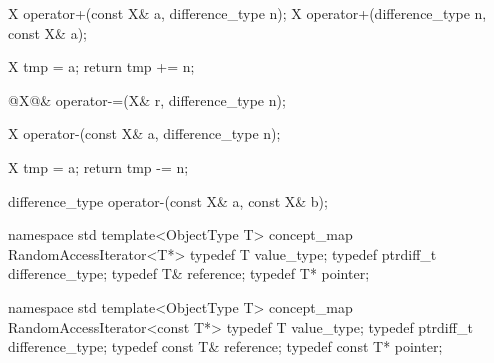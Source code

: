 \documentclass[american,twoside]{book}
\begin{document}
\begin{itemdecl}
X operator+(const X& a, difference_type n);
X operator+(difference_type n, const X& a);
\end{itemdecl}

\pnum
{}
\begin{codeblock}
{ X tmp = a;
return tmp += n; }
\end{codeblock}

\pnum
{}

\begin{itemdecl}
@\textcolor{addclr}{X}@& operator-=(X& r, difference_type n);
\end{itemdecl}

\pnum
{}

\begin{itemdecl}
X operator-(const X& a, difference_type n);
\end{itemdecl}

\pnum
{}
\begin{codeblock}
{ X tmp = a;
  return tmp -= n; }
\end{codeblock}

\begin{itemdecl}
difference_type operator-(const X& a, const X& b);
\end{itemdecl}

\pnum
{}

\pnum
{}

\pnum
{}

\pnum
{}

\begin{codeblock}
namespace std {
  template<ObjectType T> concept_map RandomAccessIterator<T*> {
    typedef T value_type;
    typedef ptrdiff_t difference_type;
    typedef T& reference;
    typedef T* pointer;
  }
}
\end{codeblock}


\begin{codeblock}
namespace std {
  template<ObjectType T> concept_map RandomAccessIterator<const T*> {
    typedef T value_type;
    typedef ptrdiff_t difference_type;
    typedef const T& reference;
    typedef const T* pointer;
  }
}
\end{codeblock}
\end{document}
